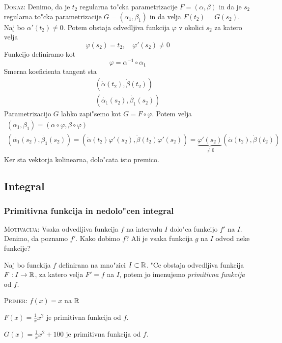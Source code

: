 \textsc{Dokaz:} Denimo, da je $t_2$ regularna to"cka parametrizacije $F = (\alpha, \beta)$ in da je $s_2$ regularna to"cka parametrizacije $G = (\alpha_1, \beta_1)$ in da velja $F(t_2) = G(s_2)$. Naj bo $\alpha'(t_2) \neq 0$. Potem obstaja odvedljiva funkcija $\varphi$ v okolici $s_2$ za katero velja
\begin{equation*}
\varphi(s_2) = t_2, \quad \varphi'(s_2) \neq 0
\end{equation*}
Funkcijo definiramo kot
\begin{equation*}
\varphi = \alpha^{-1} \circ \alpha_1
\end{equation*}
Smerna koeficienta tangent sta
\begin{gather*}
(\dot{\alpha}(t_2), \dot{\beta}(t_2)) \\
(\dot{\alpha_1}(s_2), \dot{\beta_1}(s_2))
\end{gather*}
Parametrizacijo $G$ lahko zapi"semo kot $G = F \circ \varphi$. Potem velja
\begin{gather*}
(\alpha_1, \beta_1) = (\alpha \circ \varphi, \beta \circ \varphi) \\
(\dot{\alpha_1}(s_2), \dot{\beta_1}(s_2)) = (\dot{\alpha}(t_2) \varphi'(s_2), \dot{\beta}(t_2) \varphi'(s_2)) = \underbrace{\varphi'(s_2)}_{\neq 0} (\dot{\alpha}(t_2), \dot{\beta}(t_2))
\end{gather*}
Ker sta vektorja kolinearna, dolo"cata isto premico.
%
\subsection{Integral}
\subsubsection{Primitivna funkcija in nedolo"cen integral}
\textsc{Motivacija:} Vsaka odvedljiva funkcija $f$ na intervalu $I$ dolo"ca funkcijo $f'$ na $I$. Denimo, da poznamo $f'$. Kako dobimo $f$? Ali je vsaka funkcija $g$ na $I$ odvod neke funkcije?

 Naj bo funckija $f$ definirana na mno"zici $I \subset \mathbb{R}$. "Ce obstaja odvedljiva funkcija $F: I \to \mathbb{R}$, za katero velja $F' = f$ na $I$, potem jo imenujemo \emph{primitivna funkcija} od $f$.

\textsc{Primer:} $f(x) = x$ na $\mathbb{R}$

$F(x) = \frac{1}{x} x^2$ je primitivna funkcija od $f$.

$G(x) = \frac{1}{x} x^2 + 100$ je primitivna funkcija od $f$.

